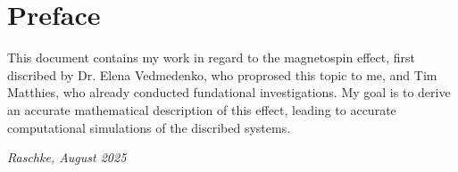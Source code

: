 \chapter*{Preface}
\label{ch:preface}

This document contains my work in regard to the magnetospin effect, first discribed by Dr. Elena Vedmedenko, who proprosed this topic to me, and Tim Matthies, who already conducted fundational investigations. My goal is to derive an accurate mathematical description of this effect, leading to accurate computational simulations of the discribed systems.

\hfill \emph{Raschke, August 2025}

